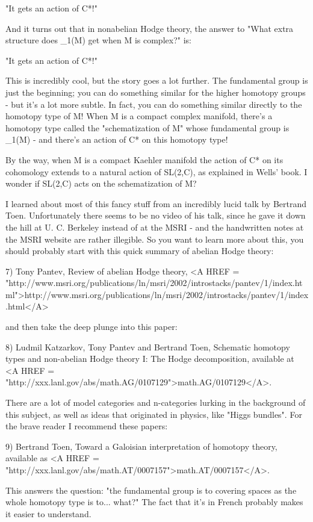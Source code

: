 "It gets an action of C*!"

And it turns out that in nonabelian Hodge theory, the answer to
"What extra structure does \Pi _{1}(M) get when M is
complex?" is:

"It gets an action of C*!"

This is incredibly cool, but the story goes a lot further.  The
fundamental group is just the beginning; you can do something similar
for the higher homotopy groups - but it's a lot more subtle.  In fact,
you can do something similar directly to the homotopy type of M!  When M
is a compact complex manifold, there's a homotopy type called the
"schematization of M" whose fundamental group is
\Pi _{1}(M) - and there's an action of C* on this homotopy type!

By the way, when M is a compact Kaehler manifold the action of 
C* on its cohomology extends to a natural action of SL(2,C), as 
explained in Wells' book.  I wonder if SL(2,C) acts on the schematization 
of M?

I learned about most of this fancy stuff from an incredibly lucid
talk by Bertrand Toen.  Unfortunately there seems to be no video of his 
talk, since he gave it down the hill at U. C. Berkeley instead of at
the MSRI - and the handwritten notes at the MSRI website are rather
illegible.  So you want to learn more about this, you should probably
start with this quick summary of abelian Hodge theory:

7) Tony Pantev, Review of abelian Hodge theory, 
<A HREF = "http://www.msri.org/publications/ln/msri/2002/introstacks/pantev/1/index.html">http://www.msri.org/publications/ln/msri/2002/introstacks/pantev/1/index.html</A>

and then take the deep plunge into this paper:

8) Ludmil Katzarkov, Tony Pantev and Bertrand Toen, Schematic homotopy
types and non-abelian Hodge theory I: The Hodge decomposition, 
available at <A HREF = "http://xxx.lanl.gov/abs/math.AG/0107129">math.AG/0107129</A>.

There are a lot of model categories and n-categories lurking in 
the background of this subject, as well as ideas that originated
in physics, like "Higgs bundles".  For the brave reader I recommend 
these papers:

9) Bertrand Toen, Toward a Galoisian interpretation of homotopy theory,
available as <A HREF = "http://xxx.lanl.gov/abs/math.AT/0007157">math.AT/0007157</A>.

This answers the question: "the fundamental group is to covering
spaces as the whole homotopy type is to... what?"  The fact that
it's in French probably makes it easier to understand.

